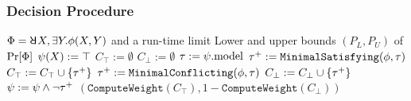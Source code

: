 \begin{frame}
    \frametitle{Decision Procedure}
    {\small
        \begin{algorithmic}[1]
            \REQUIRE
            $\Qf=\random{} X,\exists Y.\pf(X,Y)$ and a run-time limit \timeout
            \ENSURE
            Lower and upper bounds $(P_L,P_U)$ of $\Pr[\Phi]$
            \STATE $\psi(X) := \top$
            \STATE $C_\top := \emptyset$
            \STATE $C_\bot := \emptyset$
            \STATE $\tau := \psi.\mathrm{model}$
            \IF{($\sat{\pcf{\pf}{\as}}$)}
            \STATE $\tau^+ := \texttt{MinimalSatisfying}(\phi,\tau)$
            \STATE $C_\top := C_\top \cup \{\tau^+\}$
            \ELSE
            \STATE $\tau^+ := \texttt{MinimalConflicting}(\phi,\tau)$
            \STATE $C_\bot := C_\bot \cup \{\tau^+\}$
            \ENDIF
            \STATE $\psi := \psi \land \lnot\tau^+$
            \ENDWHILE
            \RETURN $(\texttt{ComputeWeight}(C_\top),1-\texttt{ComputeWeight}(C_\bot))$
        \end{algorithmic}
    }
\end{frame}